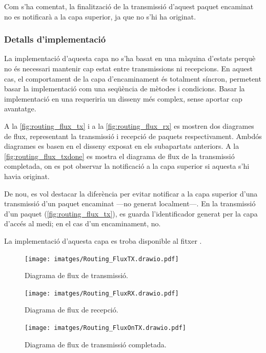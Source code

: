 \documentclass{tfgitic}[2024/07/01]
\begin{document}
{Com s'ha comentat, la finalització de la transmissió d'aquest paquet encaminat no es notificarà a la capa superior, ja que no s'hi ha originat.
\subsubsection{Detalls d'implementació}
La implementació d'aquesta capa no s'ha basat en una màquina d'estats perquè no és necessari mantenir cap estat entre transmissions ni recepcions. En aquest cas, el comportament de la capa d'encaminament és totalment síncron, permetent basar la implementació com una seqüència de mètodes i condicions. Basar la implementació en una  requeriria un disseny més complex, sense aportar cap avantatge. 
 
A la \autoref{fig:routing_flux_tx} i a la \autoref{fig:routing_flux_rx} es mostren dos diagrames de flux, representant la transmissió i recepció de paquets respectivament. Ambdós diagrames es basen en el disseny exposat en els subapartats anteriors. A la \autoref{fig:routing_flux_txdone} es mostra el diagrama de flux de la transmissió completada, on es pot observar la notificació a la capa superior si aquesta s'hi havia originat. 

De nou, es vol destacar la diferència per evitar notificar a la capa superior d'una transmissió d'un paquet encaminat ---no generat localment---. En la transmissió d'un paquet (\autoref{fig:routing_flux_tx}), es guarda l'identificador generat per la capa d'accés al medi; en el cas d'un encaminament, no.

La implementació d'aquesta capa es troba disponible al fitxer .

\begin{figure}
    \centering
        \texttt{[image: imatges/Routing\_FluxTX.drawio.pdf]}
    \caption{Diagrama de flux de transmissió.}
    \label{fig:routing_flux_tx}
\end{figure}

\begin{figure}
    \centering
        \texttt{[image: imatges/Routing\_FluxRX.drawio.pdf]}
    \caption{Diagrama de flux de recepció.}
    \label{fig:routing_flux_rx}
\end{figure}

\begin{figure}
    \centering
        \texttt{[image: imatges/Routing\_FluxOnTX.drawio.pdf]}
    \caption{Diagrama de flux de transmissió completada.}
    \label{fig:routing_flux_txdone}
\end{figure}

}
\end{document}
